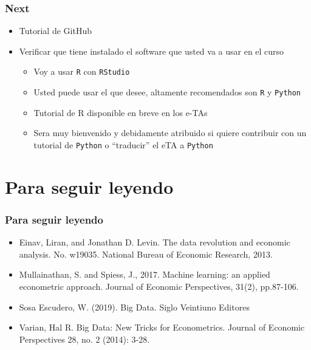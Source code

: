 \documentclass[
  shownotes,
  xcolor={svgnames},
  hyperref={colorlinks,citecolor=DarkBlue,linkcolor=DarkRed,urlcolor=DarkBlue}
  ]{beamer}
\begin{document}
\begin{frame}
\frametitle{Next}
  
  \begin{itemize} 
  \item Tutorial de GitHub
  \bigskip
  \item Verificar que tiene instalado el software que usted va a usar en el curso 
  \medskip
    \begin{itemize} 
      \item Voy a usar \texttt{R} con \texttt{RStudio}
      \medskip
      \item Usted puede usar el que desee, altamente recomendados son \texttt{R} y \texttt{Python} 
      \medskip
      \item Tutorial de R disponible en breve en los e-TAs
      \medskip
      \item Sera muy bienvenido y debidamente atribuido si quiere contribuir con un tutorial de \texttt{Python} o ``traducir'' el eTA a \texttt{Python} 
    \end{itemize}
  \end{itemize}


\end{frame}


\section{Para seguir leyendo }

\begin{frame}
\frametitle{Para seguir leyendo}

\begin{itemize}
  \item Einav, Liran, and Jonathan D. Levin. The data revolution and economic analysis. No. w19035. National Bureau of Economic Research, 2013.
  \bigskip
  \item Mullainathan, S. and Spiess, J., 2017. Machine learning: an applied econometric approach. Journal of Economic Perspectives, 31(2), pp.87-106.
  \bigskip
  \item Sosa Escudero, W. (2019). Big Data. Siglo Veintiuno Editores
  \bigskip
  \item Varian, Hal R. Big Data: New Tricks for Econometrics. Journal of Economic Perspectives 28, no. 2 (2014): 3-28.

\end{itemize}
\end{frame}
\end{document}
